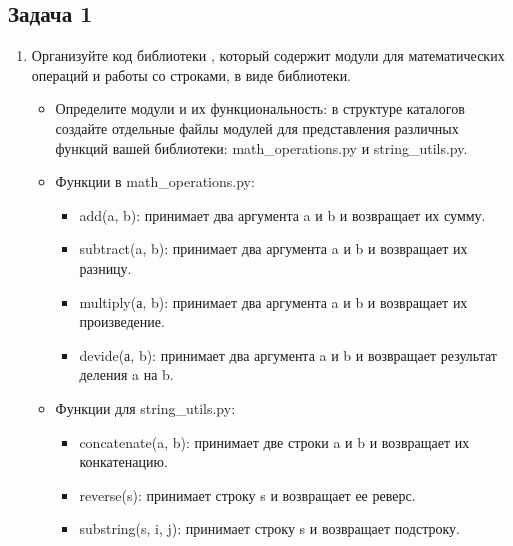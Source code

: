 \documentclass[letterpaper,10pt,russian]{sphinxmanual}
\begin{document}
\subsection{Задача 1}
\label{\detokenize{educational_materials/code_to_lib/exercises:id2}}\begin{enumerate}
%
\item {} 
\sphinxAtStartPar
Организуйте код библиотеки , который содержит модули для математических операций и работы со строками, в виде библиотеки.
\begin{itemize}
\item {} 
\sphinxAtStartPar
Определите модули и их функциональность: в структуре каталогов создайте отдельные файлы модулей для представления различных функций вашей библиотеки: math\_operations.py и string\_utils.py.

\item {} 
\sphinxAtStartPar
Функции в math\_operations.py:
\begin{itemize}
\item {} 
\sphinxAtStartPar
add(a, b): принимает два аргумента a и b и возвращает их сумму.

\item {} 
\sphinxAtStartPar
subtract(a, b): принимает два аргумента a и b и возвращает их разницу.

\item {} 
\sphinxAtStartPar
multiply(а, b): принимает два аргумента a и b и возвращает их произведение.

\item {} 
\sphinxAtStartPar
devide(а, b): принимает два аргумента a и b и возвращает результат деления a на b.

\end{itemize}

\item {} 
\sphinxAtStartPar
Функции для string\_utils.py:
\begin{itemize}
\item {} 
\sphinxAtStartPar
concatenate(a, b): принимает две строки a и b и возвращает их конкатенацию.

\item {} 
\sphinxAtStartPar
reverse(s): принимает строку s и возвращает ее реверс.

\item {} 
\sphinxAtStartPar
substring(s, i, j): принимает строку s и возвращает подстроку.


\end{itemize}
\end{itemize}
\end{enumerate}
\end{document}
